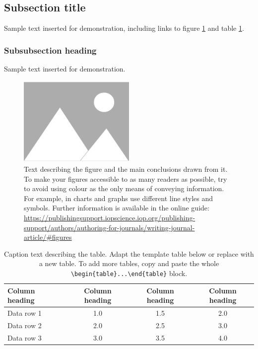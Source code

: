 \documentclass{iopjournal}
\begin{document}

\subsection{Subsection title}
Sample text inserted for demonstration, including links to figure \ref{fig1} and table \ref{tab1}.

\subsubsection{Subsubsection heading}
Sample text inserted for demonstration.

\begin{figure}
 \centering
        \includegraphics[width=0.5\textwidth]{figure1}
 \caption{Text describing the figure and the main conclusions drawn from it. To make your figures accessible to as many readers as possible, try to avoid using colour as the only means of conveying information. For example, in charts and graphs use different line styles and symbols. Further information is available in the online guide: \href{https://publishingsupport.iopscience.iop.org/publishing-support/authors/authoring-for-journals/writing-journal-article/\#figures}{https://publishingsupport.iopscience.iop.org/publishing-support/authors/authoring-for-journals/writing-journal-article/\#figures}}
\label{fig1}
\end{figure}


\begin{table}
\caption{Caption text describing the table. Adapt the template table below or replace with a new table. To add more tables, copy and paste the whole {\tt \textbackslash begin\{table\}...\textbackslash end\{table\}} block.}
\centering
\begin{tabular}{l c c c}
\hline
Column heading & Column heading & Column heading & Column heading \\
\hline
Data row 1 & 1.0 & 1.5 & 2.0 \\
Data row 2 & 2.0 & 2.5 & 3.0 \\
Data row 3 & 3.0 & 3.5 & 4.0 \\
\hline
\end{tabular}
\label{tab1}
\end{table}
\end{document}
